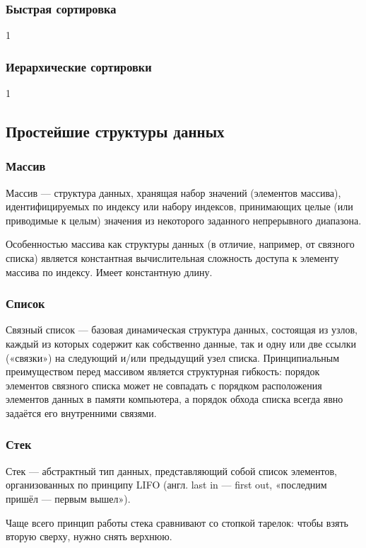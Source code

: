 \documentclass[12pt]{matmex-diploma}
\begin{document}
        \subsubsection*{Быстрая сортировка}
            1
        \subsubsection*{Иерархические сортировки}
            1
    \subsection{Простейшие структуры данных}
    
        \subsubsection*{Массив}
            Массив — структура данных, хранящая набор значений (элементов массива), идентифицируемых по индексу или набору индексов, принимающих целые (или приводимые к целым) значения из некоторого заданного непрерывного диапазона. 
            
            Особенностью массива как структуры данных (в отличие, например, от связного списка) является константная вычислительная сложность доступа к элементу массива по индексу. Имеет константную длину.
            
        \subsubsection*{Список}
            Связный список — базовая динамическая структура данных, состоящая из узлов, каждый из которых содержит как собственно данные, так и одну или две ссылки («связки») на следующий и/или предыдущий узел списка. Принципиальным преимуществом перед массивом является структурная гибкость: порядок элементов связного списка может не совпадать с порядком расположения элементов данных в памяти компьютера, а порядок обхода списка всегда явно задаётся его внутренними связями.
            
        \subsubsection*{Стек}
            Стек — абстрактный тип данных, представляющий собой список элементов, организованных по принципу LIFO (англ. last in — first out, «последним пришёл — первым вышел»).

            Чаще всего принцип работы стека сравнивают со стопкой тарелок: чтобы взять вторую сверху, нужно снять верхнюю.
            
\end{document}
